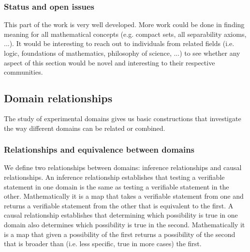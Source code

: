 \documentclass[twocolumn]{article}
\newif\ifextended
\newcommand\fact[2]{\ifextended \emph{#1}. #2 \fi}
\begin{document}
\fact{Decidable and undecidable statements}{A theoretical statement is decidable if the associated test always terminates, which means the boundary is empty. This corresponds to a clopen set. It is undecidable if the associated test never terminates, which means the boundary is the full set.\footnote{For example, ``there are three apples in the bowl'' is a decidable statement, while ``the mass of the electron is a rational number when expressed in eV'' is undecidable.}}

\subsubsection{Status and open issues}

This part of the work is very well developed. More work could be done in finding meaning for all mathematical concepts (e.g. compact sets, all separability axioms, ...). It would be interesting to reach out to individuals from related fields (i.e. logic, foundations of mathematics, philosophy of science, ...) to see whether any aspect of this section would be novel and interesting to their respective communities.

\subsection{Domain relationships}

The study of experimental domains gives us basic constructions that investigate the way different domains can be related or combined.

\subsubsection{Relationships and equivalence between domains}

We define two relationships between domains: inference relationships and causal relationships. An inference relationship establishes that testing a verifiable statement in one domain is the same as testing a verifiable statement in the other. Mathematically it is a map that takes a verifiable statement from one and returns a verifiable statement from the other that is equivalent to the first. A causal relationship establishes that determining which possibility is true in one domain also determines which possibility is true in the second. Mathematically it is a map that given a possibility of the first returns a possibility of the second that is broader than (i.e. less specific, true in more cases) the first.
\end{document}

